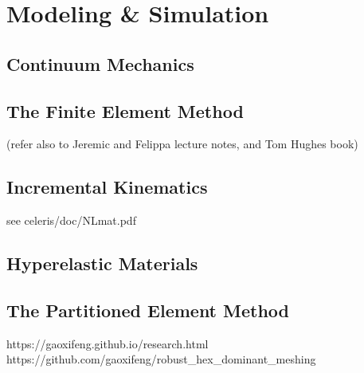 \chapter{Modeling \& Simulation}
%


\section{Continuum Mechanics}
\label{Continuum Mechanics}
\section{The Finite Element Method}
\label{The Finite Element Method}
(refer also to Jeremic and Felippa lecture notes, and Tom Hughes book)
\section{Incremental Kinematics}
\label{Incremental Kinematics}
see celeris/doc/NLmat.pdf
\section{Hyperelastic Materials}
\label{Hyperelastic Materials}
\section{The Partitioned Element Method}
\label{The Partitioned Element Method}

https://gaoxifeng.github.io/research.html \\
https://github.com/gaoxifeng/robust_hex_dominant_meshing

